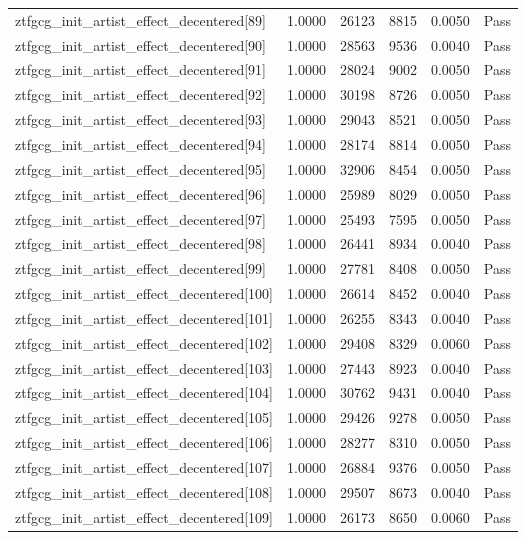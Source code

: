 \begin{table}[htbp]
\begin{tabular}{llrrll}
ztfgcg\_init\_artist\_effect\_decentered[89] & 1.0000 & 26123 & 8815 & 0.0050 & Pass \\
ztfgcg\_init\_artist\_effect\_decentered[90] & 1.0000 & 28563 & 9536 & 0.0040 & Pass \\
ztfgcg\_init\_artist\_effect\_decentered[91] & 1.0000 & 28024 & 9002 & 0.0050 & Pass \\
ztfgcg\_init\_artist\_effect\_decentered[92] & 1.0000 & 30198 & 8726 & 0.0050 & Pass \\
ztfgcg\_init\_artist\_effect\_decentered[93] & 1.0000 & 29043 & 8521 & 0.0050 & Pass \\
ztfgcg\_init\_artist\_effect\_decentered[94] & 1.0000 & 28174 & 8814 & 0.0050 & Pass \\
ztfgcg\_init\_artist\_effect\_decentered[95] & 1.0000 & 32906 & 8454 & 0.0050 & Pass \\
ztfgcg\_init\_artist\_effect\_decentered[96] & 1.0000 & 25989 & 8029 & 0.0050 & Pass \\
ztfgcg\_init\_artist\_effect\_decentered[97] & 1.0000 & 25493 & 7595 & 0.0050 & Pass \\
ztfgcg\_init\_artist\_effect\_decentered[98] & 1.0000 & 26441 & 8934 & 0.0040 & Pass \\
ztfgcg\_init\_artist\_effect\_decentered[99] & 1.0000 & 27781 & 8408 & 0.0050 & Pass \\
ztfgcg\_init\_artist\_effect\_decentered[100] & 1.0000 & 26614 & 8452 & 0.0040 & Pass \\
ztfgcg\_init\_artist\_effect\_decentered[101] & 1.0000 & 26255 & 8343 & 0.0040 & Pass \\
ztfgcg\_init\_artist\_effect\_decentered[102] & 1.0000 & 29408 & 8329 & 0.0060 & Pass \\
ztfgcg\_init\_artist\_effect\_decentered[103] & 1.0000 & 27443 & 8923 & 0.0040 & Pass \\
ztfgcg\_init\_artist\_effect\_decentered[104] & 1.0000 & 30762 & 9431 & 0.0040 & Pass \\
ztfgcg\_init\_artist\_effect\_decentered[105] & 1.0000 & 29426 & 9278 & 0.0050 & Pass \\
ztfgcg\_init\_artist\_effect\_decentered[106] & 1.0000 & 28277 & 8310 & 0.0050 & Pass \\
ztfgcg\_init\_artist\_effect\_decentered[107] & 1.0000 & 26884 & 9376 & 0.0050 & Pass \\
ztfgcg\_init\_artist\_effect\_decentered[108] & 1.0000 & 29507 & 8673 & 0.0040 & Pass \\
ztfgcg\_init\_artist\_effect\_decentered[109] & 1.0000 & 26173 & 8650 & 0.0060 & Pass \\

\end{tabular}
\end{table}

